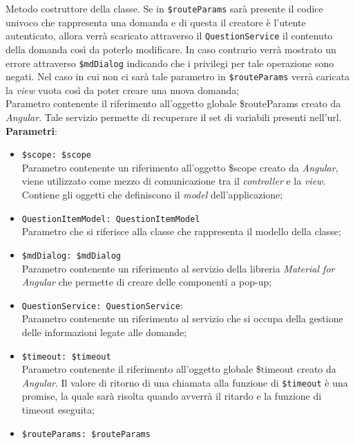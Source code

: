 \begin{itemize}
\begin{itemize}
		Metodo costruttore della classe. Se in \texttt{\$routeParams} sarà presente il codice univoco che rappresenta una domanda e di questa il creatore è l'utente autenticato, allora verrà scaricato attraverso il \texttt{QuestionService} il contenuto della domanda così da poterlo modificare. In caso contrario verrà mostrato un errore attraverso \texttt{\$mdDialog} indicando che i privilegi per tale operazione sono negati. Nel caso in cui non ci sarà tale parametro in \texttt{\$routeParams} verrà caricata la \textit{view} vuota così da poter creare una nuova domanda; \\
		Parametro contenente il riferimento all'oggetto globale \$routeParams creato da \textit{Angular}. Tale servizio permette di recuperare il set di variabili presenti nell'url.\\
		\textbf{Parametri}:
		\begin{itemize}
			\item \texttt{\$scope: \$scope} \\
			Parametro contenente un riferimento all'oggetto \$scope creato da \textit{Angular}, viene utilizzato come mezzo di comunicazione tra il \textit{controller} e la \textit{view}. Contiene gli oggetti che definiscono il \textit{model} dell'applicazione;
			\item \texttt{QuestionItemModel: QuestionItemModel} \\ 
			Parametro che si riferisce alla classe che rappresenta il modello della classe;
			\item \texttt{\$mdDialog: \$mdDialog} \\
			Parametro contenente un riferimento al servizio della libreria \textit{Material for Angular} che permette di creare delle componenti a pop-up;
			\item \texttt{QuestionService: QuestionService}: \\
			Parametro contenente un riferimento al servizio che si occupa della gestione delle informazioni legate alle domande;
			\item \texttt{\$timeout: \$timeout} \\
			Parametro contenente il riferimento all'oggetto globale \$timeout creato da \textit{Angular}. 
			Il valore di ritorno di una chiamata alla funzione di \texttt{\$timeout} è una promise, la quale sarà risolta quando avverrà il ritardo e la funzione di timeout eseguita; 
			\item \texttt{\$routeParams: \$routeParams} \\

\end{itemize}
\end{itemize}
\end{itemize}
